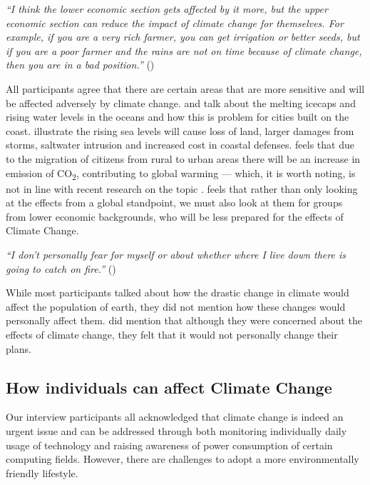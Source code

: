     \begin{quoting}
        \textit{``I think the lower economic section gets affected by it more, but the upper economic section can reduce the impact of climate change for themselves. For example, if you are a very rich farmer, you can get irrigation or better seeds, but if you are a poor farmer and the rains are not on time because of climate change, then you are in a bad position.''} ()
    \end{quoting}

    All participants agree that there are certain areas that are more sensitive and will be affected adversely by climate change.  and  talk about the melting icecaps and rising water levels in the oceans and how this is problem for cities built on the coast. \citet{hitz2004estimating} illustrate the rising sea levels will cause loss of land, larger damages from storms, saltwater intrusion and increased cost in coastal defenses.  feels that due to the migration of citizens from rural to urban areas there will be an increase in emission of CO\textsubscript{2}, contributing to global warming --- which, it is worth noting, is not in line with recent research on the topic \cite{castells2020density}.  feels that rather than only looking at the effects from a global standpoint, we must also look at them for groups from lower economic backgrounds, who will be less prepared for the effects of Climate Change.
    
    \begin{quoting}
        \textit{``I don't personally fear for myself or about whether where I live down there is going to catch on fire.''} ()
    \end{quoting}

    While most participants talked about how the drastic change in climate would affect the population of earth, they did not mention how these changes would personally affect them.  did mention that although they were concerned about the effects of climate change, they felt that it would not personally change their plans.
    \subsection{How individuals can affect Climate Change}
    
    Our interview participants all acknowledged that climate change is indeed an urgent issue and can be addressed through both monitoring individually daily usage of technology and raising awareness of power consumption of certain computing fields. However, there are challenges to adopt a more environmentally friendly lifestyle.
    
